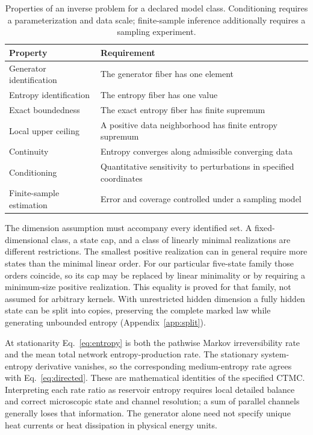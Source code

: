 \documentclass[aps,pre,onecolumn,11pt,longbibliography,notitlepage]{revtex4-2}
\newcommand{\1}{\mathbf 1}
\begin{document}
\begin{table}[ht]
\caption{Properties of an inverse problem for a declared model class. Conditioning requires a parameterization and data scale; finite-sample inference additionally requires a sampling experiment.}\label{tab:hierarchy}
\begin{ruledtabular}
\begin{tabular}{ll}
Property & Requirement\\\hline
Generator identification & The generator fiber has one element\\
Entropy identification & The entropy fiber has one value\\
Exact boundedness & The exact entropy fiber has finite supremum\\
Local upper ceiling & A positive data neighborhood has finite entropy supremum\\
Continuity & Entropy converges along admissible converging data\\
Conditioning & Quantitative sensitivity to perturbations in specified coordinates\\
Finite-sample estimation & Error and coverage controlled under a sampling model
\end{tabular}
\end{ruledtabular}
\end{table}

The dimension assumption must accompany every identified set. A fixed-dimensional class, a state cap, and a class of linearly minimal realizations are different restrictions. The smallest positive realization can in general require more states than the minimal linear order. For our particular five-state family those orders coincide, so its cap may be replaced by linear minimality or by requiring a minimum-size positive realization. This equality is proved for that family, not assumed for arbitrary kernels. With unrestricted hidden dimension a fully hidden state can be split into copies, preserving the complete marked law while generating unbounded entropy (Appendix~\ref{app:split}).

At stationarity Eq.~\eqref{eq:entropy} is both the pathwise Markov irreversibility rate and the mean total network entropy-production rate. The stationary system-entropy derivative vanishes, so the corresponding medium-entropy rate agrees with Eq.~\eqref{eq:directed}. These are mathematical identities of the specified CTMC. Interpreting each rate ratio as reservoir entropy requires local detailed balance and correct microscopic state and channel resolution; a sum of parallel channels generally loses that information. The generator alone need not specify unique heat currents or heat dissipation in physical energy units.
\end{document}
